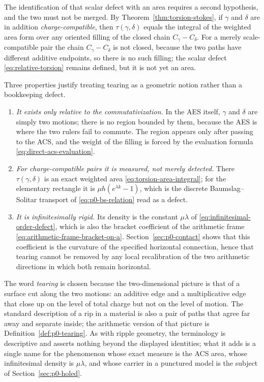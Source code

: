The identification of that scalar defect with an area requires a second
hypothesis, and the two must not be merged.  By
Theorem~\ref{thm:torsion-stokes}, if $\gamma$ and $\delta$ are in addition
\emph{charge-compatible}, then $\tau(\gamma,\delta)$ equals the integral of the
weighted area form over any oriented filling of the closed chain
$C_\gamma-C_\delta$.  For a merely scale-compatible pair the chain
$C_\gamma-C_\delta$ is not closed, because the two paths have different
additive endpoints, so there is no such filling; the scalar defect
\eqref{eq:relative-torsion} remains defined, but it is not yet an area.

Three properties justify treating tearing as a geometric notion rather than a
bookkeeping defect.

\begin{enumerate}
  \item \emph{It exists only relative to the commutativization.}  In the AES
  itself, $\gamma$ and $\delta$ are simply two motions; there is no region
  bounded by them, because the AES is where the two rulers fail to commute.  The
  region appears only after passing to the ACS, and the weight of the filling is
  forced by the evaluation formula \eqref{eq:direct-acs-evaluation}.
  \item \emph{For charge-compatible pairs it is measured, not merely detected.}
  There $\tau(\gamma,\delta)$ is an exact weighted area
  \eqref{eq:torsion-area-integral}; for the elementary rectangle it is
  $\mu h(e^{\lambda k}-1)$, which is the discrete Baumslag--Solitar transport of
  \eqref{eq:p0-bs-relation} read as a defect.
  \item \emph{It is infinitesimally rigid.}  Its density is the constant
  $\mu\lambda$ of \eqref{eq:infinitesimal-order-defect}, which is also the
  bracket coefficient of the arithmetic frame
  \eqref{eq:arithmetic-frame-bracket-on-a}.  Section~\ref{sec:p0-contact}
  shows that this coefficient is the curvature of the specified horizontal
  connection, hence
  that tearing cannot be removed by any local recalibration of the two
  arithmetic directions in which both remain horizontal.
\end{enumerate}

The word \emph{tearing} is chosen because the two-dimensional picture is that of
a surface cut along the two motions: an additive edge and a multiplicative edge
that close up on the level of total charge but not on the level of motion.  The
standard description of a rip in a material is also a pair of paths that agree
far away and separate inside; the arithmetic version of that picture is
Definition~\ref{def:p0-tearing}.  As with ripple geometry, the terminology is
descriptive and asserts nothing beyond the displayed identities; what it adds is
a single name for the phenomenon whose exact measure is the ACS area, whose
infinitesimal density is $\mu\lambda$, and whose carrier in a punctured model is
the subject of Section~\ref{sec:p0-holed}.
